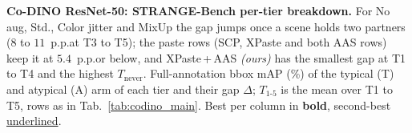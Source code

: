 \begin{table}[!htp]%
\centering
\scriptsize
\setlength{\tabcolsep}{2pt}
\caption{\textbf{Co-DINO ResNet-50: STRANGE-Bench per-tier breakdown.}
For No aug, Std., Color jitter and MixUp the gap jumps once a scene holds two partners ($8$ to $11$~p.p.\@ at T3 to T5); the paste rows (SCP, XPaste and both AAS rows) keep it at $5.4$~p.p.\@ or below, and XPaste\,+\,AAS \emph{(ours)} has the smallest gap at T1 to T4 and the highest $T_{\text{never}}$. Full-annotation bbox mAP (\%) of the typical (T) and atypical (A) arm of each tier and their gap $\Delta$; $T_{1\text{-}5}$ is the mean over T1 to T5, rows as in Tab.~\ref{tab:codino_main}. Best per column in \textbf{bold}, second-best \underline{underlined}.}
\label{tab:codino_strange}

\end{table}
